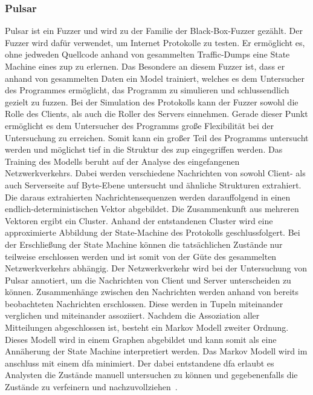 \subsubsection{Pulsar}\label{subsubsec:pulsar}
Pulsar ist ein Fuzzer und wird zu der Familie der Black-Box-Fuzzer gezählt.
Der Fuzzer wird dafür verwendet, um Internet Protokolle zu testen.
Er ermöglicht es, ohne jedweden Quellcode anhand von gesammelten Traffic-Dumps eine State Machine eines \gls{zup} zu erlernen.
Das Besondere an diesem Fuzzer ist, dass er anhand von gesammelten Daten ein Model trainiert,
welches es dem Untersucher des Programmes ermöglicht, das Programm zu simulieren und schlussendlich
gezielt zu fuzzen.
Bei der Simulation des Protokolls kann der Fuzzer sowohl die Rolle des Clients, als auch die Roller
des Servers einnehmen.
Gerade dieser Punkt ermöglicht es dem Untersucher des Programms große Flexibilität bei der Untersuchung zu erreichen.
Somit kann ein großer Teil des Programms untersucht werden und möglichst tief in die Struktur des \gls{zup} eingegriffen werden.
\newline
\noindent Das Training des Modells beruht auf der Analyse des eingefangenen Netzwerkverkehrs.
Dabei werden verschiedene Nachrichten von sowohl Client- als auch Serverseite auf Byte-Ebene untersucht und
ähnliche Strukturen extrahiert.
Die daraus extrahierten Nachrichtensequenzen werden darauffolgend in einen endlich-deterministischen Vektor abgebildet.
Die Zusammenkunft aus mehreren Vektoren ergibt ein Cluster.
Anhand der entstandenen Cluster wird eine approximierte Abbildung der State-Machine des Protokolls geschlussfolgert.
Bei der Erschließung der State Machine können die tatsächlichen Zustände nur teilweise erschlossen werden und ist somit
von der Güte des gesammelten Netzwerkverkehrs abhängig.
Der Netzwerkverkehr wird bei der Untersuchung von Pulsar annotiert, um die Nachrichten von Client und Server unterscheiden
zu können.
Zusammenhänge zwischen den Nachrichten werden anhand von bereits beobachteten Nachrichten erschlossen.
Diese werden in Tupeln miteinander verglichen und miteinander assoziiert.
Nachdem die Assoziation aller Mitteilungen abgeschlossen ist, besteht ein Markov Modell zweiter Ordnung.
Dieses Modell wird in einem Graphen abgebildet und kann somit als eine Annäherung der State Machine interpretiert werden.
Das Markov Modell wird im anschluss mit einem \gls{dfa} minimiert.
Der dabei entstandene \gls{dfa} erlaubt es Analysten die Zustände manuell untersuchen zu können und gegebenenfalls
die Zustände zu verfeinern und nachzuvollziehen~\cite{pulsar}.